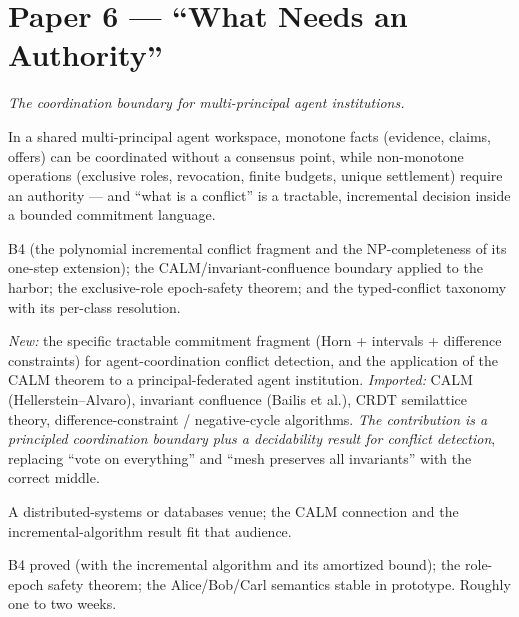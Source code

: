 \documentclass[11pt,a4paper]{article}
\begin{document}
\section{Paper 6 --- ``What Needs an Authority''}
\emph{The coordination boundary for multi-principal agent institutions.}
\begin{description}[leftmargin=0em,style=unboxed]
\item[Thesis.] In a shared multi-principal agent workspace, monotone facts (evidence, claims, offers) can be coordinated without a consensus point, while non-monotone operations (exclusive roles, revocation, finite budgets, unique settlement) require an authority --- and ``what is a conflict'' is a tractable, incremental decision inside a bounded commitment language.
\item[Results.] B4 (the polynomial incremental conflict fragment and the NP-completeness of its one-step extension); the CALM/invariant-confluence boundary applied to the harbor; the exclusive-role epoch-safety theorem; and the typed-conflict taxonomy with its per-class resolution.
\item[Novelty, honestly.] \emph{New:} the specific tractable commitment fragment (Horn + intervals + difference constraints) for agent-coordination conflict detection, and the application of the CALM theorem to a principal-federated agent institution. \emph{Imported:} CALM (Hellerstein--Alvaro), invariant confluence (Bailis et al.), CRDT semilattice theory, difference-constraint / negative-cycle algorithms. \emph{The contribution is a principled coordination boundary plus a decidability result for conflict detection}, replacing ``vote on everything'' and ``mesh preserves all invariants'' with the correct middle.
\item[Venue.] A distributed-systems or databases venue; the CALM connection and the incremental-algorithm result fit that audience.
\item[Gate.] B4 proved (with the incremental algorithm and its amortized bound); the role-epoch safety theorem; the Alice/Bob/Carl semantics stable in prototype. Roughly one to two weeks.
\end{description}
\end{document}
